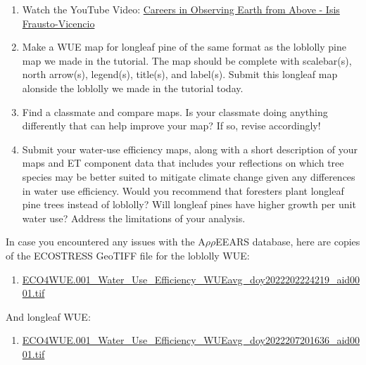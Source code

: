 \documentclass[oneside,a4paper,11pt,explicit]{book}
\begin{document}
\begin{tcolorbox}[colback=yellow!5!white,colframe=MACred,title= \vspace{.2em} \Large Make a Map Assignments]
	\large
	\begin{enumerate}
		\item Watch the YouTube Video: \href{https://youtu.be/zzgDwdQs4SY}{Careers in Observing Earth from Above - Isis Frausto-Vicencio}
        \item Make a WUE map for longleaf pine of the same format as the loblolly pine map we made in the tutorial. The map should be complete with scalebar(s), north arrow(s), legend(s), title(s), and label(s). Submit this longleaf map alonside the loblolly we made in the tutorial today.
        \item Find a classmate and compare maps. Is your classmate doing anything differently that can help improve your map? If so, revise accordingly! 
        \item Submit your water-use efficiency maps, along with a short description of your maps and ET component data that includes your reflections on which tree species may be better suited to mitigate climate change given any differences in water use efficiency. Would you recommend that foresters plant longleaf pine trees instead of loblolly? Will longleaf pines have higher growth per unit water use? Address the limitations of your analysis.
	\end{enumerate}
\end{tcolorbox}

\begin{tcolorbox}[colback=yellow!5!white,title=\textbf{Datafiles}]
	\large
	In case you encountered any issues with the A$\rho\rho$EEARS database, here are copies of the ECOSTRESS GeoTIFF file for the loblolly WUE:
	\begin{enumerate}
		\item \href{https://jeremydforsythe.github.io/icecream-tutorials/Tutorial10_Evapotranspiration2/ECO4WUE.001_Water_Use_Efficiency_WUEavg_doy2022202224219_aid0001.tif}{\small ECO4WUE.001\_Water\_Use\_Efficiency\_WUEavg\_doy2022202224219\_aid0001.tif}
	\end{enumerate}
	And longleaf WUE:
	\begin{enumerate}
		\item \href{https://jeremydforsythe.github.io/icecream-tutorials/Tutorial10_Evapotranspiration2/ECO4WUE.001_Water_Use_Efficiency_WUEavg_doy2022207201636_aid0001.tif}{\small ECO4WUE.001\_Water\_Use\_Efficiency\_WUEavg\_doy2022207201636\_aid0001.tif}
	\end{enumerate}
\end{tcolorbox}
\end{document}
